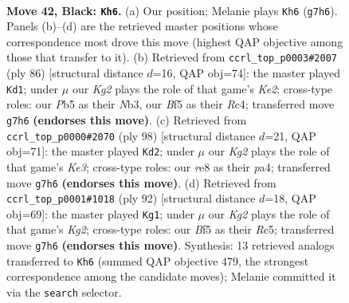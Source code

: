 \documentclass[11pt]{article}
\begin{document}
\clearpage

\begin{figure}[p]\centering
\begin{subfigure}{0.46\textwidth}\centering
\resizebox{\linewidth}{!}{%
\newchessgame
\chessboard[
  setfen={4R3/6k1/2p1N3/bp3b2/8/8/8/5K2 b - - 0 42},
  showmover=false,
  pgfstyle=straightmove, color=movearrow, markmove={g7-h6}
]}
\caption{}
\end{subfigure}\hfill
\begin{subfigure}{0.46\textwidth}\centering
\resizebox{\linewidth}{!}{%
\newchessgame
\chessboard[
  setfen={5r2/8/p2k4/6P1/2R2n2/1N6/P3K3/8 w - - 3 44},
  showmover=false,
  pgfstyle=straightmove, color=movearrow, markmove={e2-d1}
]}
\caption{}
\end{subfigure}
\\[4pt]
\begin{subfigure}{0.46\textwidth}\centering
\resizebox{\linewidth}{!}{%
\newchessgame
\chessboard[
  setfen={8/4k3/8/3n4/p1B4P/4K3/8/8 w - - 1 50},
  showmover=false,
  pgfstyle=straightmove, color=movearrow, markmove={e3-d2}
]}
\caption{}
\end{subfigure}\hfill
\begin{subfigure}{0.46\textwidth}\centering
\resizebox{\linewidth}{!}{%
\newchessgame
\chessboard[
  setfen={6k1/5p2/8/2R3PB/8/1P1rn3/6K1/8 w - - 0 47},
  showmover=false,
  pgfstyle=straightmove, color=movearrow, markmove={g2-g1}
]}
\caption{}
\end{subfigure}
\caption{\textbf{Move 42, Black: \texttt{Kh6}.} (a) Our position; Melanie plays \texttt{Kh6} (\texttt{g7h6}). Panels (b)--(d) are the retrieved master positions whose correspondence most drove this move (highest QAP objective among those that transfer to it). (b) Retrieved from \texttt{ccrl\_top\_p0003\#2007} (ply 86) [structural distance $d$=16, QAP obj=74]: the master played \texttt{Kd1}; under $\mu$ our \emph{Kg2} plays the role of that game's \emph{Ke2}; cross-type roles: our \emph{P}b5 as their \emph{N}b3, our \emph{B}f5 as their \emph{R}c4; transferred move \texttt{g7h6} \textbf{(endorses this move)}. (c) Retrieved from \texttt{ccrl\_top\_p0000\#2070} (ply 98) [structural distance $d$=21, QAP obj=71]: the master played \texttt{Kd2}; under $\mu$ our \emph{Kg2} plays the role of that game's \emph{Ke3}; cross-type roles: our \emph{r}e8 as their \emph{p}a4; transferred move \texttt{g7h6} \textbf{(endorses this move)}. (d) Retrieved from \texttt{ccrl\_top\_p0001\#1018} (ply 92) [structural distance $d$=18, QAP obj=69]: the master played \texttt{Kg1}; under $\mu$ our \emph{Kg2} plays the role of that game's \emph{Kg2}; cross-type roles: our \emph{B}f5 as their \emph{R}c5; transferred move \texttt{g7h6} \textbf{(endorses this move)}. Synthesis: 13 retrieved analogs transferred to \texttt{Kh6} (summed QAP objective 479, the strongest correspondence among the candidate moves); Melanie committed it via the \texttt{search} selector.}
\label{fig:thought-m83}
\end{figure}
\end{document}
